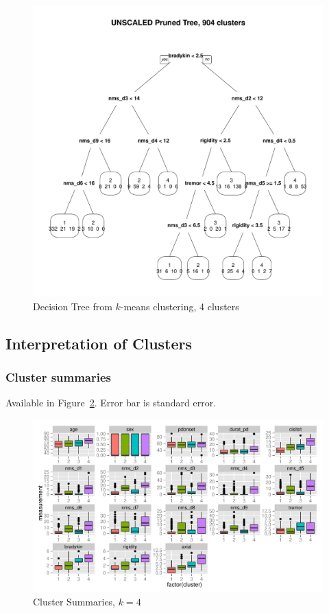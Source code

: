 \documentclass[10pt]{article}
\begin{document}
\begin{multicols}{2}
\begin{figure}[H]
  \centering
  \includegraphics[width=\linewidth]{dtree-kmeans-pruned-unscaled-4.pdf}
  \caption{Decision Tree from $k$-means clustering, 4 clusters}
  \label{fig:kmeans-dtree-4}
\end{figure}

\subsection{Interpretation of Clusters}

\subsubsection{Cluster summaries}

Available in Figure~\ref{fig:kmeans-summaries-4}. Error bar is standard error.

\begin{figure}[t]
  \centering
  \includegraphics[width=\linewidth]{kmeans-summaries-4.pdf}
  \caption{Cluster Summaries, $k = 4$}
  \label{fig:kmeans-summaries-4}
\end{figure}


\end{multicols}
\end{document}
